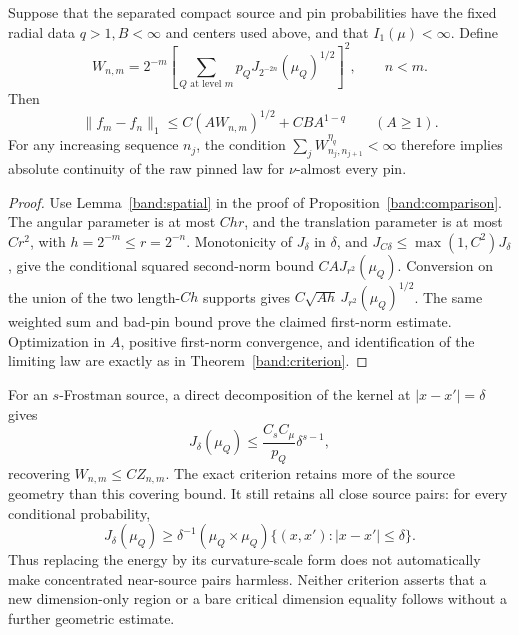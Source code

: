 \begin{proposition}
\label{band:energy-criterion}
Suppose that the separated compact source and pin probabilities have
the fixed radial data \(q>1,B<\infty\) and centers used above, and that
\(I_1(\mu)<\infty\). Define
\begin{equation}\label{band:energy-coefficient}
W_{n,m}=2^{-m}\left[
\sum_{Q\text{ at level }m}p_Q
           J_{2^{-2n}}(\mu_Q)^{1/2}\right]^2,
\qquad n<m.
\end{equation}
Then
$$
\|f_m-f_n\|_1\leq C(AW_{n,m})^{1/2}+CB A^{1-q}
\qquad(A\geq1).
$$
For any increasing sequence \(n_j\), the condition
\(\sum_j W_{n_j,n_{j+1}}^{\eta_q}<\infty\) therefore implies absolute
continuity of the raw pinned law for \(\nu\)-almost every pin.
\end{proposition}
\begin{proof}
Use Lemma~\ref{band:spatial} in the proof of
Proposition~\ref{band:comparison}. The angular parameter is at most
\(Chr\), and the translation parameter is at most \(Cr^2\), with
\(h=2^{-m}\leq r=2^{-n}\). Monotonicity of \(J_\delta\) in
\(\delta\), and \(J_{C\delta}\leq\max(1,C^2)J_\delta\), give the
conditional squared second-norm bound \(CAJ_{r^2}(\mu_Q)\).
Conversion on the union of the two length-\(Ch\) supports gives
\(C\sqrt{Ah}\,J_{r^2}(\mu_Q)^{1/2}\). The same weighted sum and bad-pin
bound prove the claimed first-norm estimate. Optimization in \(A\),
positive first-norm convergence, and identification of the limiting
law are exactly as in Theorem~\ref{band:criterion}.
\end{proof}

For an \(s\)-Frostman source, a direct decomposition of the kernel at
\(|x-x'|=\delta\) gives
$$
J_\delta(\mu_Q)\leq \frac{C_sC_\mu}{p_Q}\delta^{s-1},
$$
recovering \(W_{n,m}\leq C Z_{n,m}\). The exact criterion retains more
of the source geometry than this covering bound. It still retains all
close source pairs: for every conditional probability,
$$
J_\delta(\mu_Q)\geq
\delta^{-1}(\mu_Q\times\mu_Q)
             \{(x,x'):|x-x'|\leq\delta\}.
$$
Thus replacing the energy by its curvature-scale form does not
automatically make concentrated near-source pairs harmless. Neither
criterion asserts that a new dimension-only region or a bare critical
dimension equality follows without a further geometric estimate.
